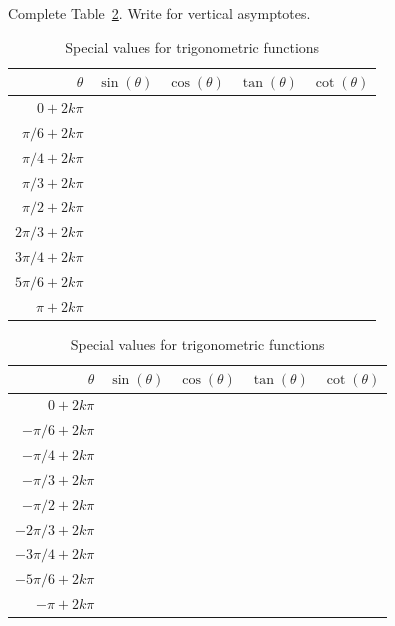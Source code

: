 \documentclass[../main.tex]{subfiles}
\begin{document}
\begin{exercise}
  Complete Table~\ref{table:trig-values}.  Write  for vertical asymptotes.

  \begin{table}[H]
    \begin{tabular}{r|p{1cm}|p{1cm}|p{1cm}|p{1cm}}
      \(\theta\) & \(\sin(\theta)\) & \(\cos(\theta)\) & \(\tan(\theta)\) & \(\cot(\theta)\) \\\toprule
      \(    0 + 2k\pi\)  &&&& \\[2ex]\midrule\midrule
      \(\pi/6 + 2k\pi\)  &&&& \\[2ex]\midrule
      \(\pi/4 + 2k\pi\)  &&&& \\[2ex]\midrule
      \(\pi/3 + 2k\pi\)  &&&& \\[2ex]\midrule\midrule
      \(\pi/2 + 2k\pi\)  &&&& \\[2ex]\midrule\midrule
      \(2\pi/3 + 2k\pi\) &&&& \\[2ex]\midrule
      \(3\pi/4 + 2k\pi\) &&&& \\[2ex]\midrule
      \(5\pi/6 + 2k\pi\) &&&& \\[2ex]\midrule\midrule
      \(   \pi + 2k\pi\) &&&& \\[2ex]
    \end{tabular}
    \quad
    \begin{tabular}{r|p{1cm}|p{1cm}|p{1cm}|p{1cm}}
      \(\theta\) & \(\sin(\theta)\) & \(\cos(\theta)\) & \(\tan(\theta)\) & \(\cot(\theta)\) \\\toprule
      \(     0 + 2k\pi\)  &&&& \\[2ex]\midrule\midrule
      \(-\pi/6 + 2k\pi\)  &&&& \\[2ex]\midrule
      \(-\pi/4 + 2k\pi\)  &&&& \\[2ex]\midrule
      \(-\pi/3 + 2k\pi\)  &&&& \\[2ex]\midrule\midrule
      \( -\pi/2 + 2k\pi\) &&&& \\[2ex]\midrule\midrule
      \(-2\pi/3 + 2k\pi\) &&&& \\[2ex]\midrule
      \(-3\pi/4 + 2k\pi\) &&&& \\[2ex]\midrule
      \(-5\pi/6 + 2k\pi\) &&&& \\[2ex]\midrule
      \midrule
      \(   -\pi + 2k\pi\) &&&& \\[2ex]
    \end{tabular}

    \caption{Special values for trigonometric functions}
    \label{table:trig-values}
  \end{table}
\end{exercise}
\clearpage
\end{document}
